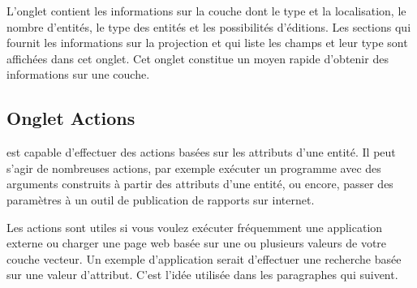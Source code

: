 L'onglet  contient les informations sur la couche dont le type 
et la localisation, le nombre d'entités, le type des entités et les possibilités 
d'éditions. Les sections  
qui fournit les informations sur la projection et  qui liste les champs et leur type sont affichées dans cet 
onglet. Cet onglet constitue un moyen rapide d'obtenir des informations sur 
une couche.

\subsection{Onglet Actions}\label{label_actions}

\qg est capable d'effectuer des actions basées sur les attributs d'une entité. 
Il peut s'agir de nombreuses actions, par exemple exécuter un programme avec 
des arguments construits à partir des attributs d'une entité, ou encore, passer 
des paramètres à un outil de publication de rapports sur internet.

Les actions sont utiles si vous voulez exécuter fréquemment une application 
externe ou charger une page web basée sur une ou plusieurs valeurs de votre 
couche vecteur. Un exemple d'application serait d'effectuer une recherche basée 
sur une valeur d'attribut. C'est l'idée utilisée dans les paragraphes qui 
suivent.

